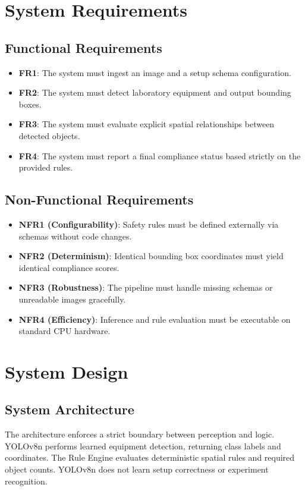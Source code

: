 \documentclass[12pt,a4paper]{report}
\begin{document}
\chapter{System Requirements}
\section{Functional Requirements}
\begin{itemize}
    \item \textbf{FR1}: The system must ingest an image and a setup schema configuration.
    \item \textbf{FR2}: The system must detect laboratory equipment and output bounding boxes.
    \item \textbf{FR3}: The system must evaluate explicit spatial relationships between detected objects.
    \item \textbf{FR4}: The system must report a final compliance status based strictly on the provided rules.
\end{itemize}

\section{Non-Functional Requirements}
\begin{itemize}
    \item \textbf{NFR1 (Configurability)}: Safety rules must be defined externally via schemas without code changes.
    \item \textbf{NFR2 (Determinism)}: Identical bounding box coordinates must yield identical compliance scores.
    \item \textbf{NFR3 (Robustness)}: The pipeline must handle missing schemas or unreadable images gracefully.
    \item \textbf{NFR4 (Efficiency)}: Inference and rule evaluation must be executable on standard CPU hardware.
\end{itemize}

\chapter{System Design}
\section{System Architecture}
The architecture enforces a strict boundary between perception and logic. YOLOv8n performs learned equipment detection, returning class labels and coordinates. The Rule Engine evaluates deterministic spatial rules and required object counts. YOLOv8n does not learn setup correctness or experiment recognition.
\end{document}
